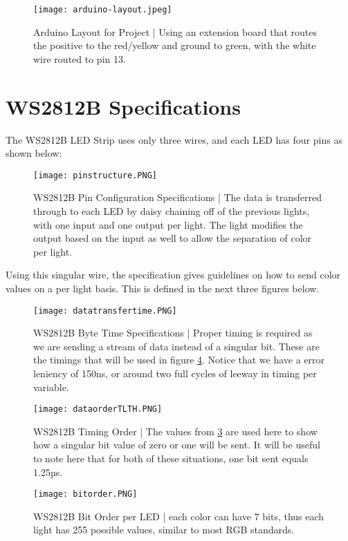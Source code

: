 \documentclass{scrartcl}
\begin{document}
\begin{figure}[h]
    \centering
    \texttt{[image: arduino-layout.jpeg]}
    \caption{Arduino Layout for Project | Using an extension board that routes the positive to the red/yellow and ground to green, with the white wire routed to pin 13.}
    \label{fig:arduino_;ayout}
\end{figure}
\pagebreak


\section{WS2812B Specifications}

The WS2812B LED Strip uses only three wires, and each LED has four pins as shown below:
\begin{figure}[h]
    \centering
    \texttt{[image: pinstructure.PNG]}
    \caption{WS2812B Pin Configuration Specifications | The data is transferred through to each LED by daisy chaining off of the previous lights, with one input and one output per light. The light modifies the output based on the input as well to allow the separation of color per light.}
    \label{fig:pin_structure}
\end{figure}

\pagebreak
Using this singular wire, the specification gives guidelines on how to send color values on a per light basis. This is defined in the next three figures below.
\begin{figure}[H]
    \centering
    \texttt{[image: datatransfertime.PNG]}
    \caption{WS2812B Byte Time Specifications | Proper timing is required as we are sending a stream of data instead of a singular bit. These are the timings that will be used in figure \ref{fig:timing_order}.
    Notice that we have a error leniency of 150ns, or around two full cycles of leeway in timing per variable.}
    \label{fig:byte_timing}
\end{figure}

\begin{figure}[H]
    \centering
    \texttt{[image: dataorderTLTH.PNG]}
    \caption{WS2812B Timing Order | The values from \ref{fig:byte_timing} are used here to show how a singular bit value of zero or one will be sent. It will be useful to note here that for both of these situations, one bit sent equals 1.25µs. }
    
    \label{fig:timing_order}
\end{figure}

\begin{figure}[H]
    \centering
    \texttt{[image: bitorder.PNG]}
    \caption{WS2812B Bit Order per LED | each color can have 7 bits, thus each light has 255 possible values, similar to most RGB standards.}
    \label{fig:bitorder}
\end{figure}
\pagebreak
\end{document}
